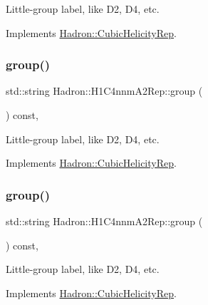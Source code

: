 Little-\/group label, like D2, D4, etc. 

Implements \mbox{\hyperlink{structHadron_1_1CubicHelicityRep_a101a7d76cd8ccdad0f272db44b766113}{Hadron\+::\+Cubic\+Helicity\+Rep}}.

\mbox{\label{structHadron_1_1H1C4nnmA2Rep_a618b727c856720ba9e2828e3485f6733}} 
\subsubsection{\texorpdfstring{group()}{group()}\hspace{0.1cm}{\footnotesize\ttfamily [3/5]}}
{\footnotesize\ttfamily std\+::string Hadron\+::\+H1\+C4nnm\+A2\+Rep\+::group (\begin{DoxyParamCaption}{ }\end{DoxyParamCaption}) const\hspace{0.3cm}{\ttfamily [inline]}, {\ttfamily [virtual]}}

Little-\/group label, like D2, D4, etc. 

Implements \mbox{\hyperlink{structHadron_1_1CubicHelicityRep_a101a7d76cd8ccdad0f272db44b766113}{Hadron\+::\+Cubic\+Helicity\+Rep}}.

\mbox{\label{structHadron_1_1H1C4nnmA2Rep_a618b727c856720ba9e2828e3485f6733}} 
\subsubsection{\texorpdfstring{group()}{group()}\hspace{0.1cm}{\footnotesize\ttfamily [4/5]}}
{\footnotesize\ttfamily std\+::string Hadron\+::\+H1\+C4nnm\+A2\+Rep\+::group (\begin{DoxyParamCaption}{ }\end{DoxyParamCaption}) const\hspace{0.3cm}{\ttfamily [inline]}, {\ttfamily [virtual]}}

Little-\/group label, like D2, D4, etc. 

Implements \mbox{\hyperlink{structHadron_1_1CubicHelicityRep_a101a7d76cd8ccdad0f272db44b766113}{Hadron\+::\+Cubic\+Helicity\+Rep}}.

